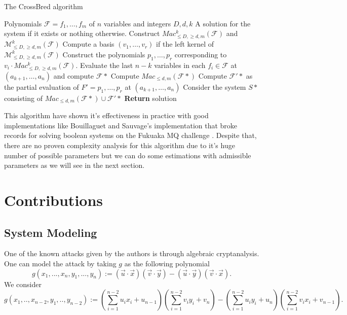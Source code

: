 \documentclass[english]{article}
\begin{document}
		\begin{algorithm}
			\caption{The CrossBred algorithm}\label{alg:crossbred}
			\begin{algorithmic}[1]
				\Require Polynomials $\mathcal{F} = {f_1, \dots, f_m}$ of $n$ variables and integers $D,d,k$
				\Ensure  A solution for the system if it exists or nothing otherwise.
				\State Construct $Mac_{\leq D, \geq d, m}^k(\mathcal{F})$ and $\mathcal{M}_{\leq D, \geq d, m}^k(\mathcal{F})$
				\State Compute a basis $(v_1,\dots,v_r)$ if the left kernel of $\mathcal{M}_{\leq D, \geq d, m}^k(\mathcal{F})$
				\State Construct the polynomials $p_1,\dots,p_r$ corresponding to $v_i \cdot Mac_{\leq D, \geq d, m}^k(\mathcal{F})$.
				\State Evaluate the last $n-k$ variables in each $f_i \in \mathcal{F}$ at $(a_{k+1},\dots,a_n)$ and compute $\mathcal{F}*$
				\State Compute $Mac_{\leq d, m}(\mathcal{F}*)$
				\State Compute $\mathcal{F}'*$ as the partial evaluation of $F' = {p_1,\dots,p_r}$ at $(a_{k+1},\dots,a_n)$
				\State Consider the system $S*$ consisting of $Mac_{\leq d, m}(\mathcal{F}*) \cup \mathcal{F}'*$
				\State \textbf{Return} solution
				\EndIf
				\EndFor
			\end{algorithmic}
		\end{algorithm}
		
		This algorithm have shown it's effectiveness in practice with good implementations like Bouillaguet and Sauvage's implementation \cite {BS23} that broke records for solving boolean systems on the Fukuaka MQ challenge \cite{MQFUK}. Despite that, there are no proven complexity analysis for this algorithm due to it's huge number of possible parameters but we can do some estimations with admissible parameters as we will see in the next section.

	\section{Contributions}\label{sec4}
		
		\subsection{System Modeling}
		One of the known attacks given by the authors is through algebraic cryptanalysis.
		One can model the attack by taking $g$ as the following polynomial
		$$
		g(x_1,...,x_n,y_1,...,y_n) := (\vec{u} \cdot \vec{x})(\vec{v} \cdot \vec{y}) - (\vec{u} \cdot \vec{y})(\vec{v} \cdot \vec{x}).
		$$
		We consider
		$$
		g(x_1,..,x_{n-2},y_1,..,y_{n-2}) := (\sum_{i = 1}^{n-2}u_{i}x_{i} + u_{n-1})(\sum_{i = 1}^{n-2}v_{i}y_{i} + v_{n}) - (\sum_{i = 1}^{n-2}u_{i}y_{i} + u_{n})(\sum_{i = 1}^{n-2}v_{i}x_{i} + v_{n-1}).
		$$
		
\end{document}
